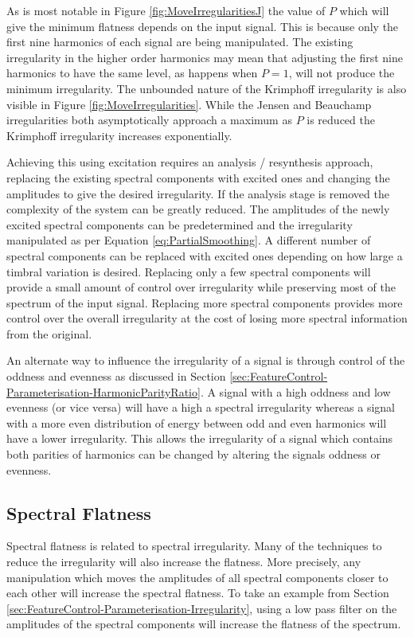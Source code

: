 		As is most notable in Figure \ref{fig:MoveIrregularitiesJ} the value of $P$ which will give the minimum
		flatness depends on the input signal. This is because only the first nine harmonics of each signal are
		being manipulated. The existing irregularity in the higher order harmonics may mean that adjusting the
		first nine harmonics to have the same level, as happens when $P = 1$, will not produce the minimum
		irregularity. The unbounded nature of the Krimphoff irregularity is also visible in Figure
		\ref{fig:MoveIrregularities}.  While the Jensen and Beauchamp irregularities both asymptotically approach a
		maximum as $P$ is reduced the Krimphoff irregularity increases exponentially.

		Achieving this using excitation requires an analysis / resynthesis approach, replacing the existing
		spectral components with excited ones and changing the amplitudes to give the desired irregularity. If the
		analysis stage is removed the complexity of the system can be greatly reduced. The amplitudes of the newly
		excited spectral components can be predetermined and the irregularity manipulated as per Equation
		\ref{eq:PartialSmoothing}. A different number of spectral components can be replaced with excited ones
		depending on how large a timbral variation is desired. Replacing only a few spectral components will
		provide a small amount of control over irregularity while preserving most of the spectrum of the input
		signal. Replacing more spectral components provides more control over the overall irregularity at the cost
		of losing more spectral information from the original.

		An alternate way to influence the irregularity of a signal is through control of the oddness and evenness
		as discussed in Section \ref{sec:FeatureControl-Parameterisation-HarmonicParityRatio}. A signal with a high
		oddness and low evenness (or vice versa) will have a high a spectral irregularity whereas a signal with a
		more even distribution of energy between odd and even harmonics will have a lower irregularity. This allows
		the irregularity of a signal which contains both parities of harmonics can be changed by altering the
		signals oddness or evenness.

	\subsection{Spectral Flatness}
	\label{sec:FeatureControl-Parameterisation-Flatness}
		Spectral flatness is related to spectral irregularity. Many of the techniques to reduce the irregularity
		will also increase the flatness. More precisely, any manipulation which moves the amplitudes of all
		spectral components closer to each other will increase the spectral flatness. To take an example from
		Section \ref{sec:FeatureControl-Parameterisation-Irregularity}, using a low pass filter on the amplitudes
		of the spectral components will increase the flatness of the spectrum.

